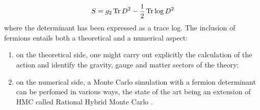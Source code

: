 \begin{equation}
S = g_2 \operatorname{Tr} D^2 - \frac{1}{2} \operatorname{Tr} \log D^2
\end{equation}
where the determinant has been expressed as a trace log.\newline
The inclusion of fermions entails both a theoretical and a numerical aspect:
\begin{enumerate}
\item on the theoretical side, one might carry out explicitly the calculation of the action and identify the gravity, gauge and matter sectors of the theory;
\item on the numerical side, a Monte Carlo simulation with a fermion determinant can be perfomed in various ways, the state of the art being an extension of HMC called Rational Hybrid Monte Carlo \cite{rhmc}.
\end{enumerate}

